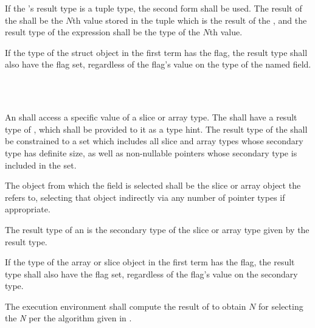 \specsubsubitem
If the 's result type is a tuple type,
the second form shall be used. The result of the
 shall be the $N$th value stored in the
tuple which is the result of the , and the
result type of the expression shall be the type of the $N$th value.

\specsubsubitem
If the type of the struct object in the first term has the 
flag, the result type shall also have the  flag set, regardless
of the flag's value on the type of the named field.


\begin{grammar}
 \\
	 \terminal{[}  \terminal{]} \\
\end{grammar}

\specsubsubitem
An  shall access a specific value of a slice
or array type. The  shall have a result type of
, which shall be provided to it as a type hint. The result type
of the  shall be constrained to a set which
includes all slice and array types whose secondary type has definite size, as
well as non-nullable pointers whose secondary type is included in the set.


\specsubsubitem
The object from which the field is selected shall be the slice or array object
the  refers to, selecting that object indirectly
via any number of pointer types if appropriate.

\specsubsubitem
The result type of an  is the secondary type
of the slice or array type given by the  result
type.

\specsubsubitem
If the type of the array or slice object in the first term has the
 flag, the result type shall also have the 
flag set, regardless of the flag's value on the secondary type.

\specsubsubitem
The execution environment shall compute the result of
 to obtain $N$ for selecting the \textit{N} per the
algorithm given in .

